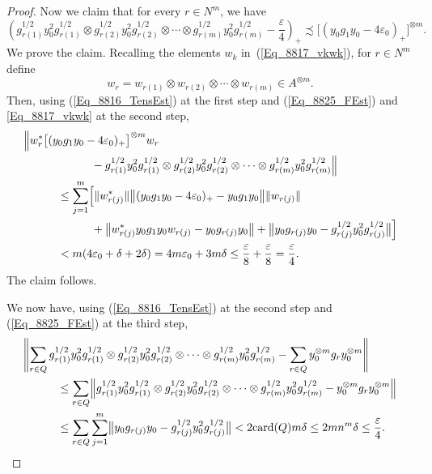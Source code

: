 \documentclass[11pt]{amsart}
\theoremstyle{plain}
\theoremstyle{definition}
\theoremstyle{remark}
\numberwithin{equation}{section}
\newcommand{\dt}{\delta}
\newcommand{\ep}{\varepsilon}
\newcommand{\card}{{\operatorname{card}}}
\begin{document}
\begin{proof}
Now we claim that for every $r \in N^m$, we have
%
\begin{equation}\label{Eq_8817_TPDom}
\left( g_{r (1)}^{1/2} y_0^2 g_{r (1)}^{1/2}
     \otimes g_{r (2)}^{1/2} y_0^2 g_{r (2)}^{1/2}
     \otimes \cdots
     \otimes g_{r (m)}^{1/2} y_0^2 g_{r (m)}^{1/2}
   - \frac{\ep}{4} \right)_{+}
  \precsim \bigl[ ( y_0 g_1 y_0 - 4 \ep_0 )_{+} \bigr]^{\otimes m}.
\end{equation}
%
We prove the claim.
Recalling the elements $w_k$ in~(\ref{Eq_8817_vkwk}),
for $r \in N^m$ define
\[
w_r = w_{r (1)} \otimes w_{r (2)} \otimes \cdots \otimes w_{r (m)}
 \in A^{\otimes m}.
\]
Then,
using (\ref{Eq_8816_TensEst}) at the first step
and (\ref{Eq_8825_FEst}) and \eqref{Eq_8817_vkwk} at the second step,
%
\begin{align*}
& \Bigl\| w_r^* \bigl[ ( y_0 g_1 y_0 - 4 \ep_0 )_{+} \bigr]^{\otimes m}
                                    w_r
\\
& \hspace*{6em} {\mbox{}}
        -  g_{r (1)}^{1/2} y_0^2 g_{r (1)}^{1/2}
     \otimes g_{r (2)}^{1/2} y_0^2 g_{r (2)}^{1/2}
     \otimes \cdots
     \otimes g_{r (m)}^{1/2} y_0^2 g_{r (m)}^{1/2} \Bigr\|
\\
& \hspace*{3em} {\mbox{}}
  \leq \sum_{j = 1}^m \Bigl[ \| w_{r (j)}^* \|
       \bigl\| ( y_0 g_1 y_0 - 4 \ep_0 )_{+} -y_0 g_1 y_0 \bigr\|
                  \| w_{r (j)} \|
\\
& \hspace*{6em} {\mbox{}}
          + \bigl\| w_{r (j)}^* y_0 g_1 y_0 w_{r (j)}
                            - y_0 g_{r (j)} y_0 \bigr\|
          + \bigl\| y_0 g_{r (j)} y_0
                - g_{r (j)}^{1/2} y_0^2 g_{r (j)}^{1/2} \bigr\| \Bigr]
\\
& \hspace*{3em} {\mbox{}}
  < m ( 4 \ep_0 + \dt + 2 \dt )
  = 4 m \ep_0 + 3 m \dt
  \leq \frac{\ep}{8} + \frac{\ep}{8}
  = \frac{\ep}{4}.
\end{align*}
%
The claim follows.

We now have,
using (\ref{Eq_8816_TensEst}) at the second step
and (\ref{Eq_8825_FEst}) at the third step,
%
\begin{align*}
&
\Biggl\| \sum_{r \in Q} g_{r (1)}^{1/2} y_0^2 g_{r (1)}^{1/2}
     \otimes g_{r (2)}^{1/2} y_0^2 g_{r (2)}^{1/2}
     \otimes \cdots
     \otimes g_{r (m)}^{1/2} y_0^2 g_{r (m)}^{1/2}
   - \sum_{r \in Q} y_0^{\otimes m} g_r y_0^{\otimes m} \Biggr\|
\\
& \hspace*{3em} {\mbox{}}
\leq \sum_{r \in Q} \Bigl\| g_{r (1)}^{1/2} y_0^2 g_{r (1)}^{1/2}
     \otimes g_{r (2)}^{1/2} y_0^2 g_{r (2)}^{1/2}
     \otimes \cdots
     \otimes g_{r (m)}^{1/2} y_0^2 g_{r (m)}^{1/2}
   - y_0^{\otimes m} g_r y_0^{\otimes m} \Bigr\|
\\
& \hspace*{3em} {\mbox{}}
\leq \sum_{r \in Q} \sum_{j = 1}^m
  \bigl\| y_0 g_{r (j)} y_0
                - g_{r (j)}^{1/2} y_0^2 g_{r (j)}^{1/2} \bigr\|
< 2 \card (Q) m \dt
\leq 2 m n^m \dt
\leq \frac{\ep}{4}.
\end{align*}
%



\end{proof}
\end{document}
